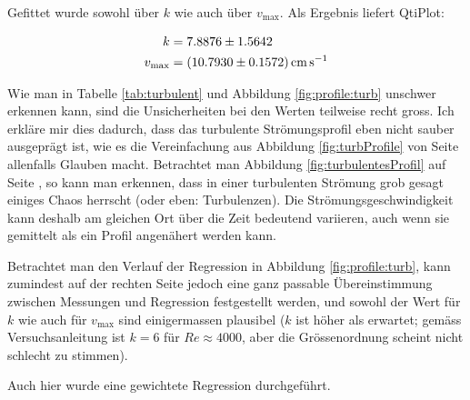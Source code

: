 Gefittet wurde sowohl \"uber $k$ wie auch \"uber $v_{\mathrm{max}}$. Als Ergebnis
liefert QtiPlot:

\begin{align}
    \label{eq:profile:turb:regression:results:k}
    k &= 7.8876 \pm 1.5642
    \\
    \label{eq:profile:turb:regression:results:vmax}
    v_{\mathrm{max}} &= \SI{10.793 \pm 0.1572}{\centi\meter\per\second}
\end{align}

Wie man  in Tabelle  \ref{tab:turbulent} und  Abbildung \ref{fig:profile:turb}
unschwer  erkennen kann,  sind  die Unsicherheiten  bei  den Werten  teilweise
recht   gross. Ich   erkl\"are  mir   dies   dadurch,   dass  das   turbulente
Str\"omungsprofil eben nicht sauber ausgepr\"agt ist, wie es die Vereinfachung
aus  Abbildung   \ref{fig:turbProfile}  von   Seite  \pageref{fig:turbProfile}
allenfalls Glauben macht. Betrachtet man Abbildung \ref{fig:turbulentesProfil}
auf  Seite  \pageref{fig:turbulentesProfil}, so  kann  man  erkennen, dass  in
einer  turbulenten  Str\"omung  grob   gesagt  einiges  Chaos  herrscht  (oder
eben: Turbulenzen). Die  Str\"omungsgeschwindigkeit kann  deshalb am  gleichen
Ort  \"uber die  Zeit bedeutend  variieren, auch  wenn sie  gemittelt als  ein
Profil angen\"ahert werden kann.

Betrachtet man den Verlauf der Regression in Abbildung \ref{fig:profile:turb},
kann   zumindest   auf  der   rechten   Seite   jedoch  eine   ganz   passable
\"Ubereinstimmung zwischen  Messungen und Regression festgestellt  werden, und
sowohl der Wert f\"ur $k$ wie auch f\"ur $v_{\mathrm{max}}$ sind einigermassen
plausibel ($k$ ist  h\"oher als erwartet; gem\"ass Versuchsanleitung  ist $k =
6$ f\"ur $\mathit{Re}  \approx 4000$, aber die  Gr\"ossenordnung scheint nicht
schlecht zu stimmen).

Auch hier wurde eine gewichtete Regression durchgef\"uhrt.
